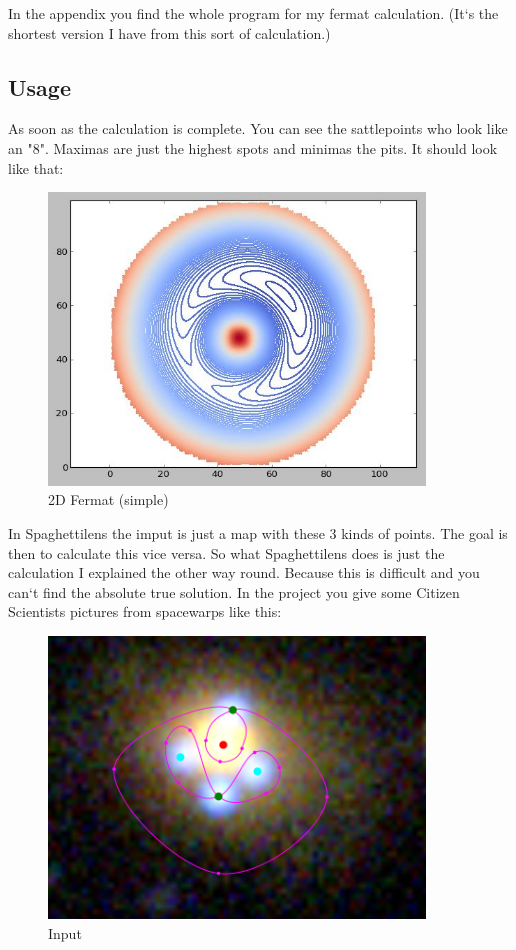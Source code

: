 \documentclass[pdftex,12pt,a4paper]{article}
\begin{document}
In the appendix you find the whole program for my fermat calculation. (It`s the shortest version I have from this sort of calculation.)

\subsection{Usage}

As soon as the calculation is complete. You can see the sattlepoints who look like an "8". Maximas are just the highest spots and minimas the pits. It should look like that:

\begin{figure}[position=h]
\centering
 \caption{2D Fermat (simple)}
 \includegraphics[width=10cm]{Bilder/simpl}%
\end{figure}

\clearfloat

In Spaghettilens the imput is just a map with these 3 kinds of points. The goal is then to calculate this vice versa. So what Spaghettilens does is just the calculation I explained the other way round. Because this is difficult and you can`t find the absolute true solution. In the project you give some Citizen Scientists pictures from spacewarps like this:

\begin{figure}[position=h]
\centering
 \caption{Input}
 \includegraphics[width=10cm]{Bilder/workinput}%
\end{figure}
\end{document}
